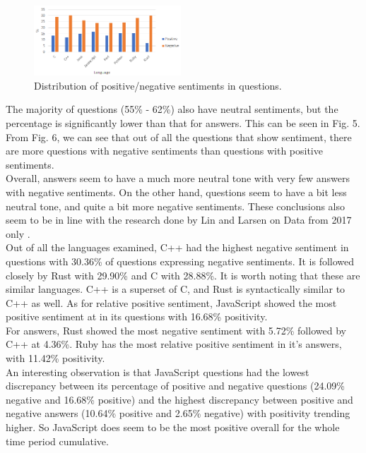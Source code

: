\documentclass[conference]{IEEEtran}
\begin{document}
\begin{figure}[htbp]
\centerline{\includegraphics[width=0.49\textwidth]{figures/summQ.png}}
\caption{Distribution of positive/negative sentiments in questions.}
\label{fig}
\end{figure}

The majority of questions (55\% - 62\%) also have neutral sentiments, but the percentage is significantly lower than that for answers. This can be seen in Fig. 5. From Fig. 6, we can see that out of all the questions that show sentiment, there are more questions with negative sentiments than questions with positive sentiments. \\

Overall, answers seem to have a much more neutral tone with very few answers with negative sentiments. On the other hand, questions seem to have a bit less neutral tone, and quite a bit more negative sentiments. These conclusions also seem to be in line with the research done by Lin and Larsen on Data from 2017 only \cite{b11}.\\

Out of all the languages examined, C++ had the highest negative sentiment in questions with 30.36\% of questions expressing negative sentiments. It is followed closely by Rust with 29.90\% and C with 28.88\%. It is worth noting that these are similar languages. C++ is a superset of C, and Rust is syntactically similar to C++ as well\cite{b37}. As for relative positive sentiment, JavaScript showed the most positive sentiment at in its questions with 16.68\% positivity.\\

For answers, Rust showed the most negative sentiment with 5.72\% followed by C++ at 4.36\%. Ruby has the most relative positive sentiment in it's answers, with 11.42\% positivity.\\

An interesting observation is that JavaScript questions had the lowest discrepancy between its percentage of positive and negative questions (24.09\% negative and 16.68\% positive) and the highest discrepancy between positive and negative answers (10.64\% positive and 2.65\% negative) with positivity trending higher. So JavaScript does seem to be the most positive overall for the whole time period cumulative.\\
\end{document}
